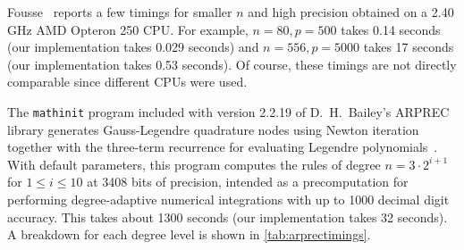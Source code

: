 \documentclass[nohypdvips,review]{siamart0216}
\begin{document}
Fousse~\cite{fousse2007accurate} reports a few timings for smaller $n$ and high precision
obtained on a 2.40 GHz AMD Opteron 250 CPU.
For example, $n = 80, p = 500$ takes 0.14 seconds (our implementation
takes 0.029 seconds) and $n = 556, p = 5000$ takes 17 seconds
(our implementation takes 0.53 seconds).
Of course, these timings are not directly comparable since different
CPUs were used.

The \texttt{mathinit} program included with version 2.2.19
of D.\ H.\ Bailey's ARPREC library
generates Gauss-Legendre quadrature nodes
using Newton iteration together with the three-term recurrence for evaluating
Legendre polynomials~\cite{bailey2002arprec,bailey2011high}.
With default parameters, this program computes the rules of degree $n = 3 \cdot 2^{i+1}$
for $1 \le i \le 10$ at 3408 bits of precision, intended as
a precomputation for performing
degree-adaptive numerical integrations with up to 1000 decimal digit accuracy.
This takes about 1300 seconds (our implementation takes 32 seconds).
A breakdown for each degree level
is shown in \cref{tab:arprectimings}.
\end{document}
